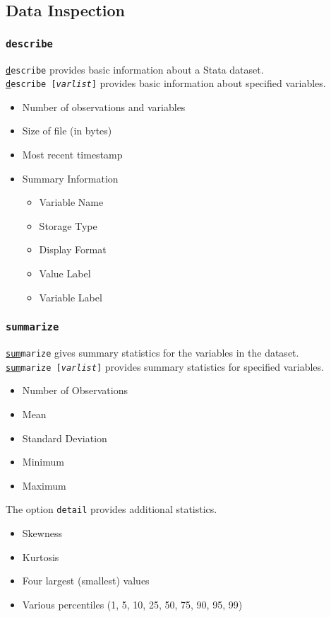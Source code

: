\documentclass{beamer}
\begin{document}
\subsection{Data Inspection}

\begin{frame}
	\frametitle{\texttt{describe}}
		\texttt{\underline{d}escribe} provides basic information about a Stata dataset. \\
		\texttt{\underline{d}escribe [\textit{varlist}]} provides basic information about specified variables.
			\begin{itemize}
			\item Number of observations and variables
			\item Size of file (in bytes)
			\item Most recent timestamp
			\item Summary Information
				\begin{itemize}
					\item Variable Name
					\item Storage Type
					\item Display Format
					\item Value Label
					\item Variable Label
				\end{itemize}
			\end{itemize}
\end{frame}

\begin{frame}
	\frametitle{\texttt{summarize}} 
		\texttt{\underline{sum}marize} gives summary statistics for the variables in the dataset. \\
		\texttt{\underline{sum}marize [\textit{varlist}]} provides summary statistics for specified variables.
			\begin{itemize}
				\item Number of Observations
				\item Mean
				\item Standard Deviation
				\item Minimum
				\item Maximum
			\end{itemize}
		The option \texttt{detail} provides additional statistics.
			\begin{itemize}
				\item Skewness
				\item Kurtosis
				\item Four largest (smallest) values
				\item Various percentiles (1, 5, 10, 25, 50, 75, 90, 95, 99)
			\end{itemize}
\end{frame}
\end{document}
